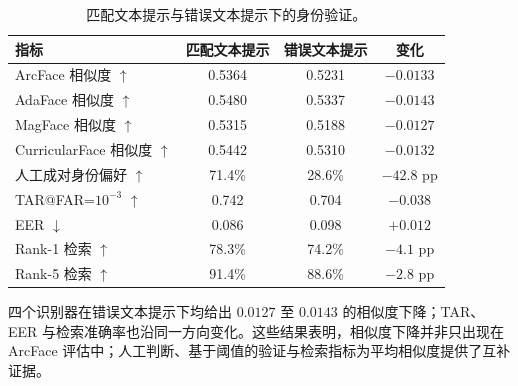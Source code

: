 \documentclass[journal]{IEEEtran}
\begin{document}
\begin{table}[!t]
\centering
\caption{匹配文本提示与错误文本提示下的身份验证。}
\label{tab:identity_verification}
{\footnotesize
\setlength{\tabcolsep}{3pt}
\begin{tabular}{lccc}
\toprule
指标 & 匹配文本提示 & 错误文本提示 & 变化 \\
\midrule
ArcFace 相似度 $\uparrow$ & 0.5364 & 0.5231 & $-0.0133$ \\
AdaFace 相似度 $\uparrow$ & 0.5480 & 0.5337 & $-0.0143$ \\
MagFace 相似度 $\uparrow$ & 0.5315 & 0.5188 & $-0.0127$ \\
CurricularFace 相似度 $\uparrow$ & 0.5442 & 0.5310 & $-0.0132$ \\
人工成对身份偏好 $\uparrow$ & 71.4\% & 28.6\% & $-42.8$ pp \\
TAR@FAR=$10^{-3}$ $\uparrow$ & 0.742 & 0.704 & $-0.038$ \\
EER $\downarrow$ & 0.086 & 0.098 & $+0.012$ \\
Rank-1 检索 $\uparrow$ & 78.3\% & 74.2\% & $-4.1$ pp \\
Rank-5 检索 $\uparrow$ & 91.4\% & 88.6\% & $-2.8$ pp \\
\bottomrule
\end{tabular}
}
\end{table}

四个识别器在错误文本提示下均给出 $0.0127$ 至 $0.0143$ 的相似度下降；TAR、EER 与检索准确率也沿同一方向变化。这些结果表明，相似度下降并非只出现在 ArcFace 评估中；人工判断、基于阈值的验证与检索指标为平均相似度提供了互补证据。


\end{document}
